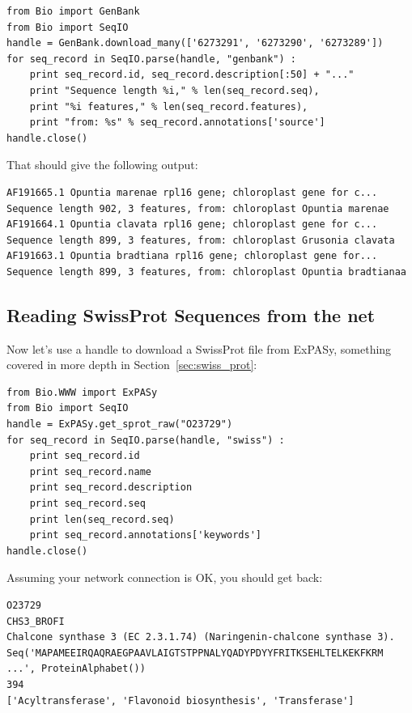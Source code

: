 \documentclass{report}
\begin{document}
\begin{verbatim}
from Bio import GenBank
from Bio import SeqIO
handle = GenBank.download_many(['6273291', '6273290', '6273289'])
for seq_record in SeqIO.parse(handle, "genbank") :
    print seq_record.id, seq_record.description[:50] + "..."
    print "Sequence length %i," % len(seq_record.seq),
    print "%i features," % len(seq_record.features),
    print "from: %s" % seq_record.annotations['source']
handle.close()
\end{verbatim}

\noindent That should give the following output:

\begin{verbatim}
AF191665.1 Opuntia marenae rpl16 gene; chloroplast gene for c...
Sequence length 902, 3 features, from: chloroplast Opuntia marenae
AF191664.1 Opuntia clavata rpl16 gene; chloroplast gene for c...
Sequence length 899, 3 features, from: chloroplast Grusonia clavata
AF191663.1 Opuntia bradtiana rpl16 gene; chloroplast gene for...
Sequence length 899, 3 features, from: chloroplast Opuntia bradtianaa
\end{verbatim}

\subsection{Reading SwissProt Sequences from the net}
\label{sec:SeqIO_ExPASy_and_SwissProt}

Now let's use a handle to download a SwissProt file from ExPASy, something covered in more depth in Section~\ref{sec:swiss_prot}:

\begin{verbatim}
from Bio.WWW import ExPASy
from Bio import SeqIO
handle = ExPASy.get_sprot_raw("O23729")
for seq_record in SeqIO.parse(handle, "swiss") :
    print seq_record.id
    print seq_record.name
    print seq_record.description
    print seq_record.seq
    print len(seq_record.seq)
    print seq_record.annotations['keywords']
handle.close()
\end{verbatim}

\noindent Assuming your network connection is OK, you should get back:

\begin{verbatim}
O23729
CHS3_BROFI
Chalcone synthase 3 (EC 2.3.1.74) (Naringenin-chalcone synthase 3).
Seq('MAPAMEEIRQAQRAEGPAAVLAIGTSTPPNALYQADYPDYYFRITKSEHLTELKEKFKRM ...', ProteinAlphabet())
394
['Acyltransferase', 'Flavonoid biosynthesis', 'Transferase']
\end{verbatim}
\end{document}
